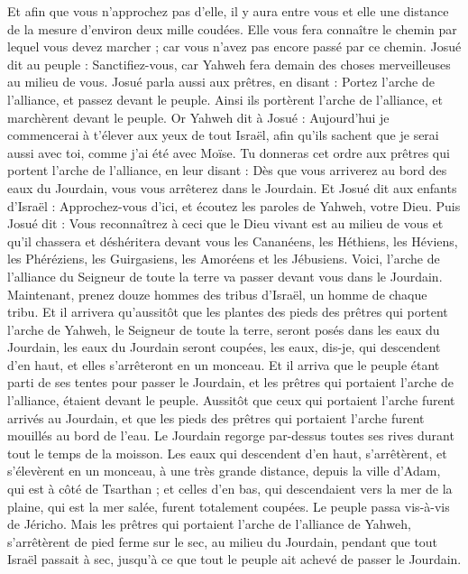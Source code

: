 \begin{multicols}{2}
Et afin que vous n'approchez pas d'elle, il y aura entre vous et elle une distance de la mesure d'environ deux mille coudées. Elle vous fera connaître le chemin par lequel vous devez marcher ; car vous n'avez pas encore passé par ce chemin.
Josué dit au peuple : Sanctifiez-vous, car Yahweh fera demain des choses merveilleuses au milieu de vous.
Josué parla aussi aux prêtres, en disant : Portez l'arche de l'alliance, et passez devant le peuple. Ainsi ils portèrent l'arche de l'alliance, et marchèrent devant le peuple.
Or Yahweh dit à Josué : Aujourd'hui je commencerai à t'élever aux yeux de tout Israël, afin qu'ils sachent que je serai aussi avec toi, comme j'ai été avec Moïse.
Tu donneras cet ordre aux prêtres qui portent l'arche de l'alliance, en leur disant : Dès que vous arriverez au bord des eaux du Jourdain, vous vous arrêterez dans le Jourdain.
Et Josué dit aux enfants d'Israël : Approchez-vous d'ici, et écoutez les paroles de Yahweh, votre Dieu.
Puis Josué dit : Vous reconnaîtrez à ceci que le Dieu vivant est au milieu de vous et qu'il chassera et déshéritera devant vous les Cananéens, les Héthiens, les Héviens, les Phéréziens, les Guirgasiens, les Amoréens et les Jébusiens.
Voici, l'arche de l'alliance du Seigneur de toute la terre va passer devant vous dans le Jourdain.
Maintenant, prenez douze hommes des tribus d'Israël, un homme de chaque tribu.
Et il arrivera qu'aussitôt que les plantes des pieds des prêtres qui portent l'arche de Yahweh, le Seigneur de toute la terre, seront posés dans les eaux du Jourdain, les eaux du Jourdain seront coupées, les eaux, dis-je, qui descendent d'en haut, et elles s'arrêteront en un monceau.
Et il arriva que le peuple étant parti de ses tentes pour passer le Jourdain, et les prêtres qui portaient l'arche de l'alliance, étaient devant le peuple.
Aussitôt que ceux qui portaient l'arche furent arrivés au Jourdain, et que les pieds des prêtres qui portaient l'arche furent mouillés au bord de l'eau. Le Jourdain regorge par-dessus toutes ses rives durant tout le temps de la moisson.
Les eaux qui descendent d'en haut, s'arrêtèrent, et s'élevèrent en un monceau, à une très grande distance, depuis la ville d'Adam, qui est à côté de Tsarthan ; et celles d'en bas, qui descendaient vers la mer de la plaine, qui est la mer salée, furent totalement coupées. Le peuple passa vis-à-vis de Jéricho.
Mais les prêtres qui portaient l'arche de l'alliance de Yahweh, s'arrêtèrent de pied ferme sur le sec, au milieu du Jourdain, pendant que tout Israël passait à sec, jusqu'à ce que tout le peuple ait achevé de passer le Jourdain.

\end{multicols}
